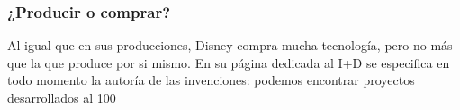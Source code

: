 \subsubsection{¿Producir o comprar?}
Al igual que en sus producciones, Disney compra mucha tecnología, pero no más que la que produce por si mismo. En su página dedicada al I+D se especifica en todo momento la autoría de las invenciones: podemos encontrar proyectos desarrollados al 100%